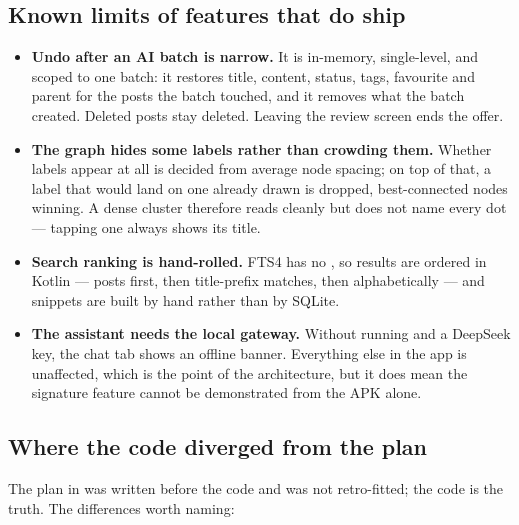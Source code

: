 \subsection{Known limits of features that do ship}

\begin{itemize}
  \item \textbf{Undo after an AI batch is narrow.} It is in-memory, single-level, and scoped to one
        batch: it restores title, content, status, tags, favourite and parent for the posts the batch
        touched, and it removes what the batch created. Deleted posts stay deleted. Leaving the review
        screen ends the offer.
  \item \textbf{The graph hides some labels rather than crowding them.} Whether labels appear at all
        is decided from average node spacing; on top of that, a label that would land on one already
        drawn is dropped, best-connected nodes winning. A dense cluster therefore reads cleanly but
        does not name every dot --- tapping one always shows its title.
  \item \textbf{Search ranking is hand-rolled.} FTS4 has no , so results are ordered in
        Kotlin --- posts first, then title-prefix matches, then alphabetically --- and snippets are
        built by hand rather than by SQLite.
  \item \textbf{The assistant needs the local gateway.} Without  running and a DeepSeek
        key, the chat tab shows an offline banner. Everything else in the app is unaffected, which is
        the point of the architecture, but it does mean the signature feature cannot be demonstrated
        from the APK alone.
\end{itemize}

\subsection{Where the code diverged from the plan}

The plan in  was written before the code and was not retro-fitted; the code is the
truth. The differences worth naming:

